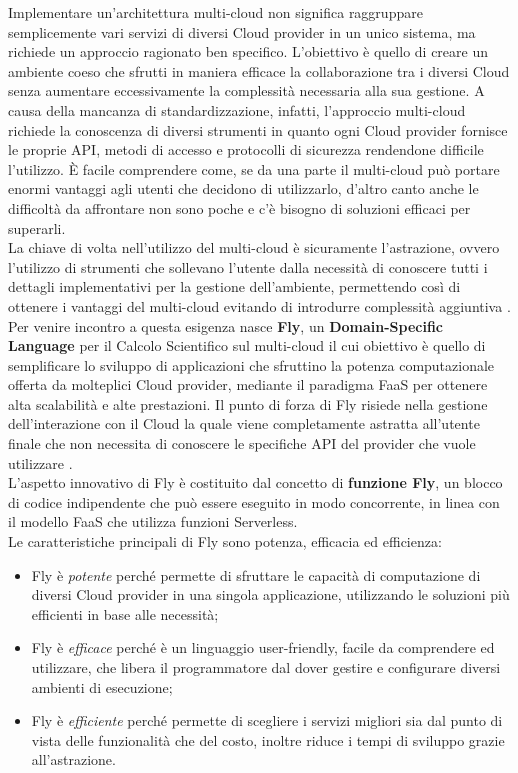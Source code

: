 Implementare un’architettura multi-cloud non significa raggruppare semplicemente vari servizi di diversi Cloud provider in un unico sistema, ma richiede un approccio ragionato ben specifico. L'obiettivo è quello di creare un ambiente coeso che sfrutti in maniera efficace la collaborazione tra i diversi Cloud senza aumentare eccessivamente la complessità necessaria alla sua gestione. A causa della mancanza di standardizzazione, infatti, l'approccio multi-cloud richiede la conoscenza di diversi strumenti in quanto ogni Cloud provider fornisce le proprie API, metodi di accesso e protocolli di sicurezza rendendone difficile l’utilizzo. È facile comprendere come, se da una parte il multi-cloud può portare enormi vantaggi agli utenti che decidono di utilizzarlo, d’altro canto anche le difficoltà da affrontare non sono poche e c'è bisogno di soluzioni efficaci per superarli. \\
La chiave di volta nell’utilizzo del multi-cloud è sicuramente l’astrazione, ovvero l'utilizzo di strumenti che sollevano l'utente dalla necessità di conoscere tutti i dettagli implementativi per la gestione dell'ambiente, permettendo così di ottenere i vantaggi del multi-cloud evitando di introdurre complessità aggiuntiva \cite{ForbesMultiCloud}. Per venire incontro a questa esigenza nasce \textbf{Fly}, un \textbf{Domain-Specific Language} per il Calcolo Scientifico sul multi-cloud il cui obiettivo è quello di semplificare lo sviluppo di applicazioni che sfruttino la potenza computazionale offerta da molteplici Cloud provider, mediante il paradigma FaaS per ottenere alta scalabilità e alte prestazioni. Il punto di forza di Fly risiede nella gestione dell'interazione con il Cloud la quale viene completamente astratta all’utente finale che non necessita di conoscere le specifiche API del provider che vuole utilizzare \cite{ISISLab}. \\
L’aspetto innovativo di Fly è costituito dal concetto di \textbf{funzione Fly}, un blocco di codice indipendente che può essere eseguito in modo concorrente, in linea con il modello FaaS che utilizza funzioni Serverless. \\
Le caratteristiche principali di Fly sono potenza, efficacia ed efficienza:

\begin{itemize}
    \item Fly è \textit{potente} perché permette di sfruttare le capacità di computazione di diversi Cloud provider in una singola applicazione, utilizzando le soluzioni più efficienti in base alle necessità;

    \item Fly è \textit{efficace} perché è un linguaggio user-friendly, facile da comprendere ed utilizzare, che libera il programmatore dal dover gestire e configurare diversi ambienti di esecuzione;
    
    \item Fly è \textit{efficiente} perché permette di scegliere i servizi migliori sia dal punto di vista delle funzionalità che del costo, inoltre riduce i tempi di sviluppo grazie all'astrazione.
\end{itemize}

